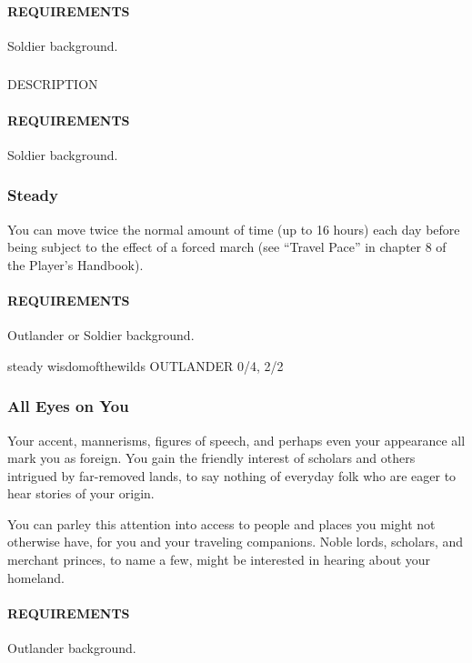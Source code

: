         \paragraph{REQUIREMENTS} Soldier background.

    \subsubsection{} \label{feat::NAME}
        DESCRIPTION
        \paragraph{REQUIREMENTS} Soldier background.

    \subsubsection{Steady} \label{feat::steady}
        You can move twice the normal amount of time (up to 16 hours) each day before being subject to the effect of a forced march (see ``Travel Pace'' in chapter 8 of the Player's Handbook).
        \paragraph{REQUIREMENTS} Outlander or Soldier background.

steady wisdomofthewilds
OUTLANDER 0/4, 2/2
    \subsubsection{All Eyes on You} \label{feat::alleyesonyou}
        Your accent, mannerisms, figures of speech, and perhaps even your appearance all mark you as foreign.
        You gain the friendly interest of scholars and others intrigued by far-removed lands, to say nothing of everyday folk who are eager to hear stories of your origin.

        You can parley this attention into access to people and places you might not otherwise have, for you and your traveling companions.
        Noble lords, scholars, and merchant princes, to name a few, might be interested in hearing about your homeland.
        \paragraph{REQUIREMENTS} Outlander background.

